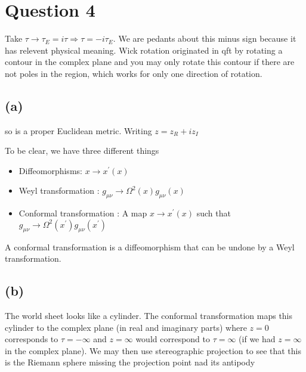 \documentclass{article}
\begin{document}
\section*{Question 4}

Take $\tau \to \tau_E = i\tau \Rightarrow \tau = -i\tau_E$. We are pedants about this minus sign because it has relevent physical meaning. Wick rotation originated in qft by rotating a contour in the complex plane and you may only rotate this contour if there are not poles in the region, which works for only one direction of rotation. \\


\subsection*{(a)}

so 
is a proper Euclidean metric. Writing $z = z_R + iz_I $

\begin{fact}
To be clear, we have three different things 
\begin{itemize}
    \item Diffeomorphisms: $x \to x^\prime(x)$ 
    \item Weyl transformation : $g_{\mu\nu} \to \Omega^2(x) g_{\mu\nu}(x)$
    \item Conformal transformation : A map $x \to x^\prime(x)$  such that $g_{\mu\nu} \to \Omega^2(x^\prime) g_{\mu\nu}(x^\prime)$
\end{itemize}
A conformal transformation is a diffeomorphism that can be undone by a Weyl transformation. 
\end{fact}


\subsection*{(b)}

The world sheet looks like a cylinder. The conformal transformation maps this cylinder to the complex plane (in real and imaginary parts) where $z=0$ corresponds to $\tau = -\infty$ and $z = \infty $ would correspond to $\tau = \infty$ (if we had $z = \infty$ in the complex plane). We may then use stereographic projection to see that this is the Riemann sphere missing the projection point nad its antipody 
\end{document}
